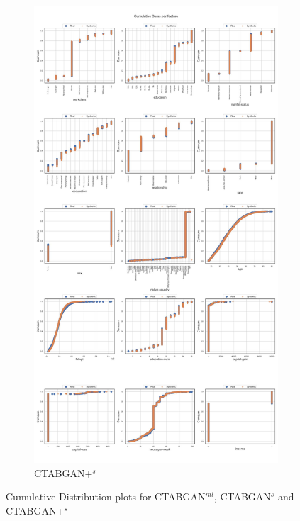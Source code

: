 \begin{landscape}
\begin{figure}[h]
\begin{subfigure}{0.3\linewidth}
			\includegraphics[height=\textheight,width=\linewidth,keepaspectratio]{images/cumsums/ctabgan+_simTune.jpg}
			\caption{CTABGAN+$^s$}
		\end{subfigure}	
		\hfill
		\caption[Cumulative Distribution plots CTABGAN Models]{Cumulative Distribution plots for CTABGAN$^{ml}$, CTABGAN$^s$ and CTABGAN+$^s$}
		\label{fig_a:cumsum_1}
	\end{figure}
\end{landscape}

